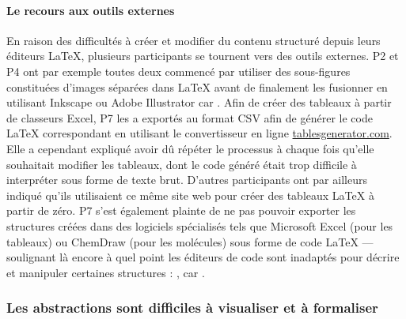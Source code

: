 \paragraph{Le recours aux outils externes}
En raison des difficultés à créer et modifier du contenu structuré depuis leurs éditeurs \LaTeX{}, plusieurs participants se tournent vers des outils externes.
P2 et P4 ont par exemple toutes deux commencé par utiliser des sous-figures constituées d'images séparées dans \LaTeX{} avant de finalement les fusionner en utilisant Inkscape ou Adobe Illustrator car .
Afin de créer des tableaux à partir de classeurs Excel, P7 les a exportés au format CSV afin de générer le code \LaTeX{} correspondant en utilisant le convertisseur en ligne \url{tablesgenerator.com}.
Elle a cependant expliqué avoir dû répéter le processus à chaque fois qu'elle souhaitait modifier les tableaux, dont le code généré était trop difficile à interpréter sous forme de texte brut.
D'autres participants ont par ailleurs indiqué qu'ils utilisaient ce même site web pour créer des tableaux \LaTeX{} à partir de zéro.
P7 s'est également plainte de ne pas pouvoir exporter les structures créées dans des logiciels spécialisés tels que Microsoft Excel (pour les tableaux) ou ChemDraw (pour les molécules) sous forme de code \LaTeX{} --- soulignant là encore à quel point les éditeurs de code sont inadaptés pour décrire et manipuler certaines structures :
, car .



\subsubsection{\printthemenumber{} Les abstractions sont difficiles à visualiser et à formaliser}

